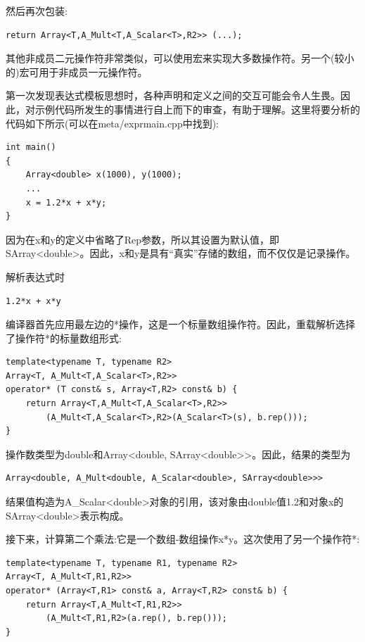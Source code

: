 然后再次包装:

\begin{lstlisting}[style=styleCXX]
return Array<T,A_Mult<T,A_Scalar<T>,R2>> (...);
\end{lstlisting}

其他非成员二元操作符非常类似，可以使用宏来实现大多数操作符。另一个(较小的)宏可用于非成员一元操作符。


第一次发现表达式模板思想时，各种声明和定义之间的交互可能会令人生畏。因此，对示例代码所发生的事情进行自上而下的审查，有助于理解。这里将要分析的代码如下所示(可以在meta/exprmain.cpp中找到):

\begin{lstlisting}[style=styleCXX]
int main()
{
	Array<double> x(1000), y(1000);
	...
	x = 1.2*x + x*y;
}
\end{lstlisting}

因为在x和y的定义中省略了Rep参数，所以其设置为默认值，即SArray<double>。因此，x和y是具有“真实”存储的数组，而不仅仅是记录操作。

解析表达式时

\begin{lstlisting}[style=styleCXX]
1.2*x + x*y
\end{lstlisting}

编译器首先应用最左边的*操作，这是一个标量数组操作符。因此，重载解析选择了操作符*的标量数组形式:

\begin{lstlisting}[style=styleCXX]
template<typename T, typename R2>
Array<T, A_Mult<T,A_Scalar<T>,R2>>
operator* (T const& s, Array<T,R2> const& b) {
	return Array<T,A_Mult<T,A_Scalar<T>,R2>>
		(A_Mult<T,A_Scalar<T>,R2>(A_Scalar<T>(s), b.rep()));
}
\end{lstlisting}

操作数类型为double和Array<double, SArray<double>>。因此，结果的类型为

\begin{lstlisting}[style=styleCXX]
Array<double, A_Mult<double, A_Scalar<double>, SArray<double>>>
\end{lstlisting}

结果值构造为A\_Scalar<double>对象的引用，该对象由double值1.2和对象x的SArray<double>表示构成。

接下来，计算第二个乘法:它是一个数组-数组操作x*y。这次使用了另一个操作符*:

\begin{lstlisting}[style=styleCXX]
template<typename T, typename R1, typename R2>
Array<T, A_Mult<T,R1,R2>>
operator* (Array<T,R1> const& a, Array<T,R2> const& b) {
	return Array<T,A_Mult<T,R1,R2>>
		(A_Mult<T,R1,R2>(a.rep(), b.rep()));
}
\end{lstlisting}

